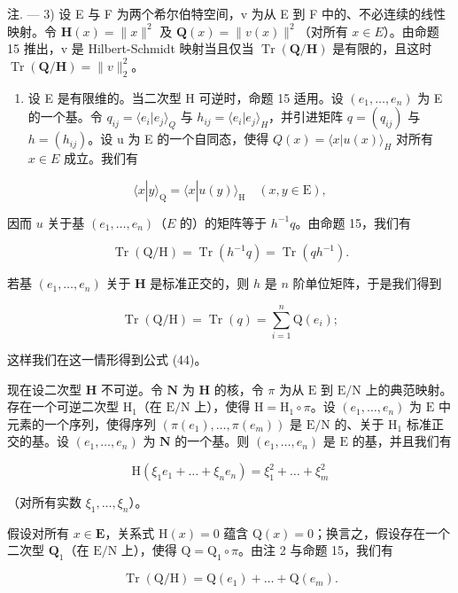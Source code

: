注. --- 3) 设 E 与 F 为两个希尔伯特空间，v 为从 E 到 F 中的、不必连续的线性映射。令 \(\mathbf{H}(x)=\|x\|^{2}\) 及 \(\mathbf{Q}(x)=\|v(x)\|^{2}\)（对所有 \(x\in E\)）。由命题 15 推出，v 是 Hilbert-Schmidt 映射当且仅当 \(\operatorname{Tr}(\mathbf{Q}/\mathbf{H})\) 是有限的，且这时 \(\operatorname{Tr}(\mathbf{Q}/\mathbf{H})=\|v\|_{2}^{2}\)。

\begin{enumerate}
\def\labelenumi{\arabic{enumi})}
\setcounter{enumi}{3}
\tightlist
\item
  设 E 是有限维的。当二次型 H 可逆时，命题 15 适用。设 \((e_{1}, \ldots, e_{n})\) 为 E 的一个基。令 \(q_{ij} = \langle e_{i}|e_{j} \rangle_{Q}\) 与 \(h_{ij} = \langle e_{i}|e_{j} \rangle_{H}\)，并引进矩阵 \(q = (q_{ij})\) 与 \(h = (h_{ij})\)。设 u 为 E 的一个自同态，使得 \(Q(x) = \langle x|u(x) \rangle_{H}\) 对所有 \(x \in E\) 成立。我们有
\end{enumerate}

\[
\langle x | y \rangle_ {\mathrm{Q}} = \langle x | u (y) \rangle_ {\mathrm{H}} \quad (x, y \in \mathrm{E}),
\]

因而 \(u\) 关于基 \((e_1, \ldots, e_n)\)（\(E\) 的）的矩阵等于 \(h^{-1}q\)。由命题 15，我们有

\[
\operatorname{Tr} (\mathrm{Q} / \mathrm{H}) = \operatorname{Tr} (h ^ {- 1} q) = \operatorname{Tr} (q h ^ {- 1}).\tag{45}
\]

若基 \((e_1, \dots, e_n)\) 关于 \(\mathbf{H}\) 是标准正交的，则 \(h\) 是 \(n\) 阶单位矩阵，于是我们得到

\[
\operatorname{Tr} (\mathrm{Q} / \mathrm{H}) = \operatorname{Tr} (q) = \sum_ {i = 1} ^ {n} \mathrm{Q} (e _ {i});
\]

这样我们在这一情形得到公式 (44)。

现在设二次型 \(\mathbf{H}\) 不可逆。令 \(\mathbf{N}\) 为 \(\mathbf{H}\) 的核，令 \(\pi\) 为从 \(\mathrm{E}\) 到 \(\mathrm{E} / \mathrm{N}\) 上的典范映射。存在一个可逆二次型 \(\mathrm{H}_1\)（在 \(\mathrm{E} / \mathrm{N}\) 上），使得 \(\mathrm{H} = \mathrm{H}_1 \circ \pi\)。设 \((e_1, \dots, e_n)\) 为 \(\mathrm{E}\) 中元素的一个序列，使得序列 \((\pi(e_1), \dots, \pi(e_m))\) 是 \(\mathrm{E} / \mathrm{N}\) 的、关于 \(\mathrm{H}_1\) 标准正交的基。设 \((e_1, \dots, e_n)\) 为 \(\mathbf{N}\) 的一个基。则 \((e_1, \dots, e_n)\) 是 \(\mathrm{E}\) 的基，并且我们有

\[
\mathrm{H} \left(\xi_ {1} e _ {1} + \dots + \xi_ {n} e _ {n}\right) = \xi_ {1} ^ {2} + \dots + \xi_ {m} ^ {2}\tag{46}
\]

（对所有实数 \(\xi_1, \ldots, \xi_n\)）。

假设对所有 \(x \in \mathbf{E}\)，关系式 \(\mathrm{H}(x) = 0\) 蕴含 \(\mathrm{Q}(x) = 0\)；换言之，假设存在一个二次型 \(\mathbf{Q}_1\)（在 \(\mathrm{E} / \mathrm{N}\) 上），使得 \(\mathrm{Q} = \mathrm{Q}_1 \circ \pi\)。由注 2 与命题 15，我们有

\[
\operatorname{Tr} (\mathrm{Q} / \mathrm{H}) = \mathrm{Q} (e _ {1}) + \dots + \mathrm{Q} (e _ {m}).\tag{47}
\]


